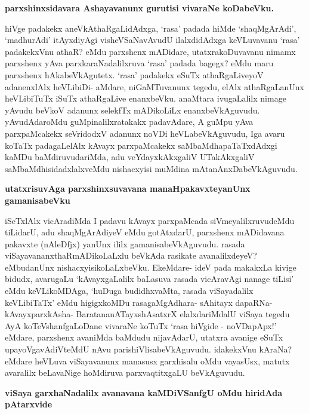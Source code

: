 {\bigskip
\noindent
{\large\bf parxshinxsidavara Ashayavanunx gurutisi vivaraNe koDabeVku.}}\label{page218a}
\medskip

\noindent
hiVge padakekx aneVkAthaRgaLidAdxga, `rasa' padada hiMde `shaqMgArAdi', `madhurAdi' itAyxdiyAgi visheVSaNavAvudU ilalxdidAdxga keVLuvavanu `rasa' padakekxVnu athaR? eMdu parxshenx mADidare, utatxrakoDuvavanu nimamx parxshenx yAva parxkaraNadalilxruva `rasa' padada bagegx? eMdu maru parxshenx hAkabeVkAgutetx. `rasa' padakekx eSuTx athaRgaLiveyoV adanenxlAlx heVLibiDi- aMdare, niGaMTuvanunx tegedu, elAlx athaRgaLanUnx heVLibiTuTx iSuTx athaRgaLive enanxbeVku. anaMtara ivugaLalilx nimage yAvudu beVkoV adanunx selekfTx mADikoLiLx enanxbeVkAguvudu. yAvudAdaroMdu guMpinalilxratakakx padavAdare, A guMpu yAva parxpaMcakekx seVridodxV adanunx noVDi heVLabeVkAguvudu, Iga avaru koTaTx padagaLelAlx kAvayx parxpaMcakekx saMbaMdhapaTaTxdAdxgi kaMDu baMdiruvudariMda, adu veYdayxkAkxgaliV UTakAkxgaliV saMbaMdhisidadxlalxveMdu nishacxyisi muMdina mAtanAnxDabeVkAguvudu.

\newpage

{\noindent
{\large\bf utatxrisuvAga parxshinxsuvavana manaHpakavxteyanUnx gamanisabeVku}}\label{page219}
\medskip

\noindent
iSeTxlAlx vicAradiMda I padavu kAvayx parxpaMcada siVmeyalilxruvudeMdu tiLidarU, adu shaqMgArAdiyeV eMdu gotAtxdarU, parxshenx mADidavana pakavxte (nAleDfjx) yanUnx ililx gamanisabeVkAguvudu. rasada viSayavananxthaRmADikoLaLxlu beVkAda rasikate avanalilxdeyeV? eMbudanUnx nishacxyisikoLaLxbeVku. EkeMdare- ideV pada makakxLa kivige bidudx, avarugaLu `kAvayxgaLalilx baLasuva rasada vicAravAgi nanage tiLisi' eMdu keVLikoMDAga, `huDuga budidhxvaMta, rasada viSayadalilx keVLibiTaTx' eMdu higigxkoMDu rasagaMgAdhara- sAhitayx dapaRNa- kAvayxparxkAsha- BaratananATayxshAsatxrX elalxdariMdalU viSaya tegedu AyA koTeVshanfgaLoDane vivaraNe koTuTx `rasa hiVgide - noVDapApx!' eMdare, parxshenx avaniMda baMdudu nijavAdarU, utatxra avanige eSuTx upayoVgavAdiVteMdU nAvu parishiVlisabeVkAguvudu. idakekxVnu kAraNa? eMdare heVLuva viSayavanunx manasusx garxhisalu oMdu vayasUsx, matutx avaralilx beLavaNige hoMdiruva parxvaqtitxgaLU beVkAguvudu.

{\bigskip
\noindent
{\large\bf viSaya garxhaNadalilx avanavana kaMDiVSanfgU oMdu hiridAda pAtarxvide}}\label{page219a}
\medskip

